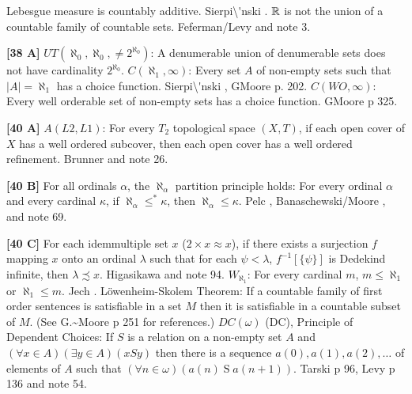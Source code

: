  Lebesgue measure is countably additive.
\ac{Sierpi\'nski} \cite{1916}.
\medskip
{} ${\Bbb R}$ is not the union of a countable family
of countable sets.  \ac{Feferman/Levy} \cite{1963} and note 3.
\smallskip
\item{}{\bf [38 A]} $UT(\aleph_{0},\aleph_{0},\neq 2^{\aleph_{0}})$: A
denumerable union  of  denumerable sets does not have cardinality
$2^{\aleph_{0}}$.
\medskip
{}  $C(\aleph_{1},\infty)$: Every set $A$ of non-empty
sets such that $\vert A\vert = \aleph_{1}$ has a choice function.
\ac{Sierpi\'nski} \cite{1918}, G\. \ac{Moore} \cite{1982} p. 202.
\medskip
{} $C(WO,\infty)$:  Every well orderable set of
non-empty sets has a choice function. G\. \ac{Moore} \cite{1982} p 325.
\smallskip
\item{}{\bf [40 A]} $A(L2,L1)$: For every $T_2$ topological space $(X,T)$,
if each open cover of $X$ has a well ordered subcover, then each open
cover has a well ordered refinement. \ac{Brunner} \cite{1983d} and note 26.
\smallskip
\item{}{\bf [40 B]}  For all ordinals $\alpha$, the $\aleph_{\alpha}$
partition principle holds:  For every ordinal $\alpha$ and every
cardinal $\kappa$, if $\aleph_{\alpha}\le^* \kappa$, then $\aleph_{\alpha}
\le\kappa$. \ac{Pelc} \cite{1978}, \ac{Banaschewski/Moore} \cite{1990},
and note 69.
\smallskip
\item{}{\bf [40 C]} For each idemmultiple set $x$ ($2\times x\approx x$),
if there exists a surjection $f$ mapping $x$ onto an ordinal $\lambda$
such that for each $\psi < \lambda$, $f^{-1}[\{\psi\}]$ is
Dedekind infinite, then $\lambda \precsim x$. \ac{Higasikawa} \cite{1995}
and note 94.
\medskip
{} $W_{\aleph _{1}}$: For every cardinal $m$, $m \le
\aleph_{1}$ or $\aleph_{1}\le m $.  \ac{Jech} \cite{1973b}.
\medskip
{} L\"owenheim-Skolem Theorem:  If a countable
family of first order  sentences is satisfiable in a set $M$ then it is
satisfiable in a countable subset of $M$. (See \ac{G.~Moore} \cite{1982}
p 251 for references.)
\medskip
{} $DC(\omega)$ (DC), Principle of Dependent Choices:
If $S$  is  a relation on a non-empty set $A$ and $(\forall x\in A)
(\exists y\in A)(x S y)$  then there is a sequence $a(0), a(1), a(2),
\ldots$ of elements of $A$ such that $(\forall n\in\omega)(a(n)\mathrel
S a(n+1))$.  \ac{Tarski} \cite{1948} p 96, \ac{Levy} \cite{1964} p 136
and note 54.

